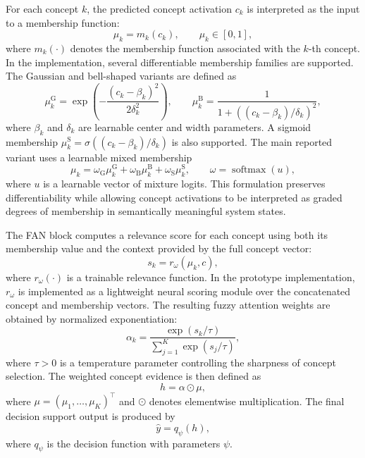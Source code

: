 \documentclass[runningheads]{llncs}
\begin{document}
For each concept $k$, the predicted concept activation $c_k$ is interpreted as the input to a membership function:
\begin{equation}
\mu_k = m_k(c_k), \qquad \mu_k \in [0,1],
\end{equation}
where $m_k(\cdot)$ denotes the membership function associated with the $k$-th concept. In the implementation, several differentiable membership families are supported. The Gaussian and bell-shaped variants are defined as
\begin{equation}
\mu^{\mathrm{G}}_k =
\exp\!\left(
-\frac{(c_k-\beta_k)^2}{2\delta_k^2}
\right),
\qquad
\mu^{\mathrm{B}}_k =
\frac{1}{1+\left((c_k-\beta_k)/\delta_k\right)^2},
\end{equation}
where $\beta_k$ and $\delta_k$ are learnable center and width parameters. A sigmoid membership $\mu^{\mathrm{S}}_k=\sigma((c_k-\beta_k)/\delta_k)$ is also supported. The main reported variant uses a learnable mixed membership
\begin{equation}
\mu_k =
\omega_{\mathrm{G}}\mu^{\mathrm{G}}_k
+ \omega_{\mathrm{B}}\mu^{\mathrm{B}}_k
+ \omega_{\mathrm{S}}\mu^{\mathrm{S}}_k,
\qquad
\omega=\operatorname{softmax}(u),
\end{equation}
where $u$ is a learnable vector of mixture logits. This formulation preserves differentiability while allowing concept activations to be interpreted as graded degrees of membership in semantically meaningful system states.

The FAN block computes a relevance score for each concept using both its membership value and the context provided by the full concept vector:
\begin{equation}
s_k = r_{\omega}(\mu_k, c),
\end{equation}
where $r_{\omega}(\cdot)$ is a trainable relevance function. In the prototype implementation, $r_{\omega}$ is implemented as a lightweight neural scoring module over the concatenated concept and membership vectors. The resulting fuzzy attention weights are obtained by normalized exponentiation:
\begin{equation}
\alpha_k =
\frac{\exp(s_k/\tau)}
{\sum_{j=1}^{K}\exp(s_j/\tau)},
\end{equation}
where $\tau>0$ is a temperature parameter controlling the sharpness of concept selection. The weighted concept evidence is then defined as
\begin{equation}
h = \alpha \odot \mu,
\end{equation}
where $\mu=(\mu_1,\dots,\mu_K)^{\top}$ and $\odot$ denotes elementwise multiplication. The final decision support output is produced by
\begin{equation}
\hat{y} = q_{\psi}(h),
\end{equation}
where $q_{\psi}$ is the decision function with parameters $\psi$.
\end{document}
